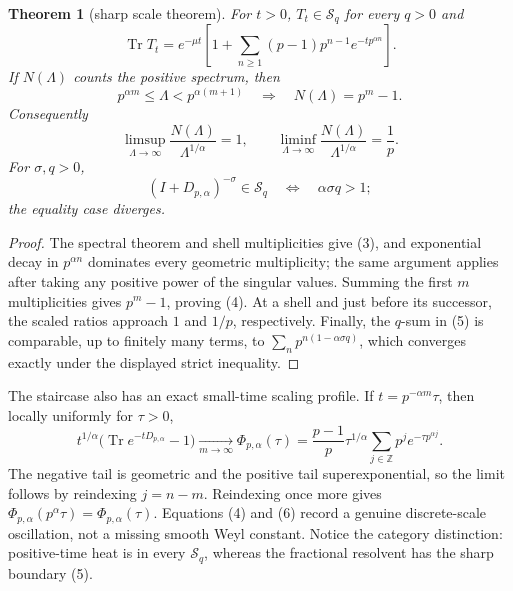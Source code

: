 \documentclass[10pt]{article}
\newtheorem{theorem}{Theorem}
\newcommand{\Tr}{\operatorname{Tr}}
\begin{document}
\begin{theorem}[sharp scale theorem]
For $t>0$, $T_t\in\mathcal S_q$ for every $q>0$ and
\begin{equation}
 \Tr T_t=e^{-\mu t}\left[1+\sum_{n\geq1}(p-1)p^{n-1}
 e^{-tp^{\alpha n}}\right].                              \tag{3}
\end{equation}
If $N(\Lambda)$ counts the positive spectrum, then
\begin{equation}
 p^{\alpha m}\leq\Lambda<p^{\alpha(m+1)}
 \quad\Longrightarrow\quad N(\Lambda)=p^m-1.             \tag{4}
\end{equation}
Consequently
\[
 \limsup_{\Lambda\to\infty}\frac{N(\Lambda)}{\Lambda^{1/\alpha}}=1,
 \qquad
 \liminf_{\Lambda\to\infty}\frac{N(\Lambda)}{\Lambda^{1/\alpha}}=\frac1p.
\]
For $\sigma,q>0$,
\begin{equation}
 (I+D_{p,\alpha})^{-\sigma}\in\mathcal S_q
 \quad\Longleftrightarrow\quad \alpha\sigma q>1;          \tag{5}
\end{equation}
the equality case diverges.
\end{theorem}
\begin{proof}
The spectral theorem and shell multiplicities give (3), and exponential decay
in $p^{\alpha n}$ dominates every geometric multiplicity; the same argument
applies after taking any positive power of the singular values.  Summing the
first $m$ multiplicities gives $p^m-1$, proving (4).  At a shell and just
before its successor, the scaled ratios approach $1$ and $1/p$, respectively.
Finally, the $q$-sum in (5) is comparable, up to finitely many terms, to
$\sum_n p^{n(1-\alpha\sigma q)}$, which converges exactly under the displayed
strict inequality.
\end{proof}

The staircase also has an exact small-time scaling profile.  If
$t=p^{-\alpha m}\tau$, then locally uniformly for $\tau>0$,
\begin{equation}
 t^{1/\alpha}\bigl(\Tr e^{-tD_{p,\alpha}}-1\bigr)
 \xrightarrow[m\to\infty]{} \Phi_{p,\alpha}(\tau)
 =\frac{p-1}{p}\tau^{1/\alpha}
 \sum_{j\in\mathbb Z}p^j e^{-\tau p^{\alpha j}}.           \tag{6}
\end{equation}
The negative tail is geometric and the positive tail superexponential, so the
limit follows by reindexing $j=n-m$.  Reindexing once more gives
$\Phi_{p,\alpha}(p^\alpha\tau)=\Phi_{p,\alpha}(\tau)$.  Equations (4) and (6)
record a genuine discrete-scale oscillation, not a missing smooth Weyl
constant.  Notice the category distinction: positive-time heat is in every
$\mathcal S_q$, whereas the fractional resolvent has the sharp boundary (5).
\fi
\end{document}
